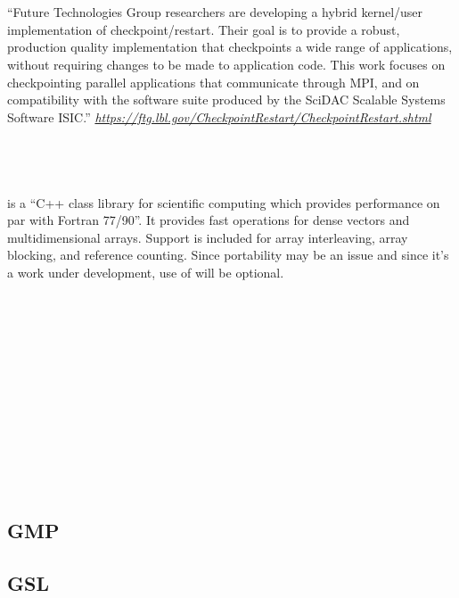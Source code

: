 \subsection{\usemaybe\ }  

``Future Technologies Group researchers are developing a hybrid
kernel/user implementation of checkpoint/restart. Their goal is to
provide a robust, production quality implementation that checkpoints a
wide range of applications, without requiring changes to be made to
application code. This work focuses on checkpointing parallel
applications that communicate through MPI, and on compatibility with
the software suite produced by the SciDAC Scalable Systems Software
ISIC.'' \textit{\url{https://ftg.lbl.gov/CheckpointRestart/CheckpointRestart.shtml}}

\subsection{\usemaybe\ }   

 is a ``C++ class library for scientific computing which
provides performance on par with Fortran 77/90''.  It provides fast
operations for dense vectors and multidimensional arrays.  Support
is included for array interleaving, array blocking, and reference counting.
Since portability may be an issue and since it's a work under development, 
use of  will be optional.

\subsection{\useno\ } 
\subsection{\usemaybe\ }  
\subsection{\useno\ }    
\subsection{\useno\ } 
\subsection{GMP}
\subsection{GSL}

